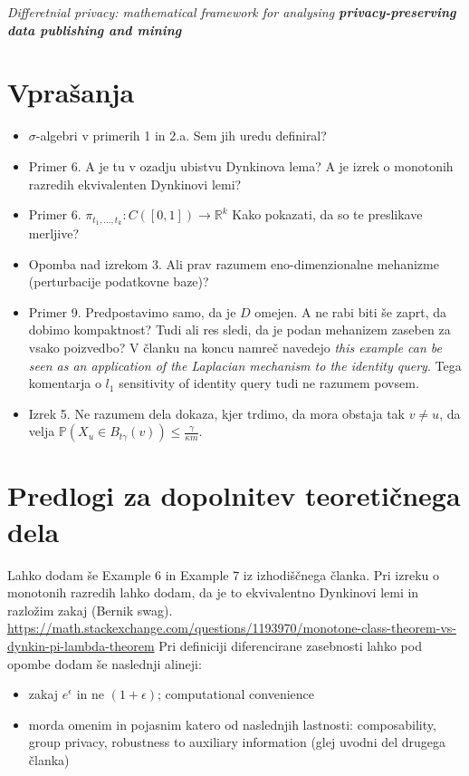 \documentclass[a4paper]{article}
\theoremstyle{definition}
\begin{document}
\textit{Differetnial privacy: mathematical framework for analysing \textbf{privacy-preserving data publishing and mining}}


\section{Vprašanja}
\begin{itemize}
\item $\sigma$-algebri v primerih 1 in 2.a. Sem jih uredu definiral?
\item Primer 6. A je tu v ozadju ubistvu Dynkinova lema? A je izrek o monotonih razredih ekvivalenten Dynkinovi lemi?
\item Primer 6.  $ \pi _{t_1,\ldots,t_k}: C([0,1]) \rightarrow \mathbb{R}^k$ Kako pokazati, da so te preslikave merljive?
\item Opomba nad izrekom 3. Ali prav razumem eno-dimenzionalne mehanizme (perturbacije podatkovne baze)?
\item Primer 9. Predpostavimo samo, da je $D$ omejen. A ne rabi biti še zaprt, da dobimo kompaktnost?  Tudi ali res sledi, da je podan mehanizem zaseben za vsako poizvedbo? V članku na koncu namreč navedejo \textit{this example can be seen as an application of the Laplacian mechanism to the identity query}. Tega komentarja o $l_1$ sensitivity of identity query tudi ne razumem povsem.
\item Izrek 5. Ne razumem dela dokaza, kjer trdimo, da mora obstaja tak $v \neq u$, da velja $\mathbb{P}(X_u \in B_{t\gamma}(v)) \leq \frac{\gamma}{\kappa m}.$ 
\end{itemize}

\section{Predlogi za dopolnitev teoretičnega dela}
Lahko dodam še Example 6 in Example 7 iz izhodiščnega članka.
\newline
\newline
Pri izreku o monotonih razredih lahko dodam, da je to ekvivalentno Dynkinovi lemi in razložim zakaj (Bernik swag).
\newline
\url{https://math.stackexchange.com/questions/1193970/monotone-class-theorem-vs-dynkin-pi-lambda-theorem}
\newline
\newline
Pri definiciji diferencirane zasebnosti lahko pod opombe dodam še naslednji alineji:
\begin{itemize}
\item zakaj $e^\epsilon$ in ne $(1+\epsilon)$; computational convenience 
\item morda omenim in pojasnim katero od naslednjih lastnosti: composability, group privacy, robustness to auxiliary information (glej uvodni del drugega članka) 
\end{itemize}
\end{document}

